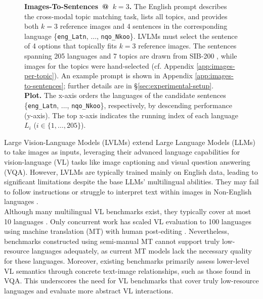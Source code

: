  \begin{figure*}[ht]
   \centering
   \vspace{-0.8cm}
   \caption{\textbf{Images-To-Sentences~@~$k{=}3$.} The English prompt describes the cross-modal topic matching task, lists all topics, and provides both $k{=}3$ reference images and 4 sentences in the corresponding language \{\texttt{eng\_Latn}, $\dots$, \texttt{nqo\_Nkoo}\}. LVLMs must select the sentence of 4 options that topically fits $k{=}3$ reference images. The sentences spanning 205 languages and 7 topics are drawn from SIB-200 \cite{adelani-etal-2024-sib}, while images for the topics were hand-selected (cf. Appendix \ref{app:images-per-topic}). An example prompt is shown in Appendix \ref{app:images-to-sentences}; further details are in \S\ref{sec:experimental-setup}. \\ \textbf{Plot.} The x-axis orders the languages of the candidate sentences \{\texttt{eng\_Latn}, $\dots$, \texttt{nqo\_Nkoo}\}, respectively, by descending performance (y-axis). The top x-axis indicates the running index of each language $L_i$ ($i \in \{1, \dots, 205\}$).}
   \vspace{-0.3cm}
   \label{fig:intro-img2sent}
 \end{figure*}

Large Vision-Language Models (LVLMs) extend Large Language Models (LLMs) to take images as inputs, leveraging their advanced language capabilities for vision-language (VL) tasks like image captioning and visual question answering (VQA). However, LVLMs are typically trained mainly on English data, leading to significant limitations despite the base LLMs' multilingual abilities. They may fail to follow instructions or struggle to interpret text within images in Non-English languages \cite{schneider-sitaram-2024-m5,tang2024mtvqa}. \\
Although many multilingual VL benchmarks exist, they typically cover at most 10 languages \cite[\textit{inter alia}]{bugliarello-etal-2022-iglue,liu-etal-2021-visually,tang2024mtvqa}. Only concurrent work has scaled VL evaluation to 100 languages using machine translation (MT) with human post-editing \cite{vayani2024alm}. Nevertheless, benchmarks constructed using semi-manual MT cannot support truly low-resource languages adequately, as current MT models lack the necessary quality for these languages. Moreover, existing benchmarks primarily assess lower-level VL semantics through concrete text-image relationships, such as those found in VQA. This underscores the need for VL benchmarks that cover truly low-resource languages and evaluate more abstract VL interactions. 

